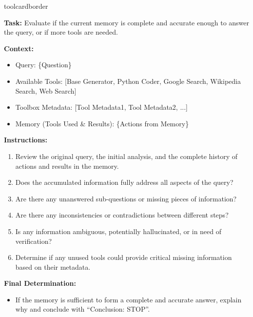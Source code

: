 \begin{custombox}[title=Instruction for {Execution Verifier}]{toolcardborder}
\setlength{\parindent}{0pt}

\textbf{Task:} Evaluate if the current memory is complete and accurate enough to answer the query, or if more tools are needed.

\vspace{6pt}

\noindent\textbf{Context:}

\begin{itemize}[left=0pt, label={}, itemsep=0pt, parsep=0pt]
 \item {Query:} {\{{Question}\}}
    
 \item {Available Tools:} [{Base Generator, Python Coder, Google Search, Wikipedia Search, Web Search}]
    
 \item {Toolbox Metadata:}  [{Tool Metadata1, Tool Metadata2, ...}]
    
 \item {Memory (Tools Used \& Results):} {\{{Actions} {from Memory}\}}
\end{itemize}

\vspace{6pt}

\noindent\textbf{Instructions:}
\begin{enumerate}[left=0pt, itemsep=0pt, parsep=0pt]
    \item Review the original query, the initial analysis, and the complete history of actions and results in the memory.
    \item Does the accumulated information fully address all aspects of the query?
        \item Are there any unanswered sub-questions or missing pieces of information?
    \item Are there any inconsistencies or contradictions between different steps?
        \item Is any information ambiguous, potentially hallucinated, or in need of verification?
    \item Determine if any {unused tools} could provide critical missing information based on their metadata.
\end{enumerate}

\vspace{6pt}

\noindent\textbf{Final Determination:}
\begin{itemize}[left=0pt, label={}, itemsep=0pt, parsep=0pt]
\item If the memory is sufficient to form a complete and accurate answer, explain why and conclude with {``Conclusion: STOP''}.
    

\end{itemize}
\end{custombox}
